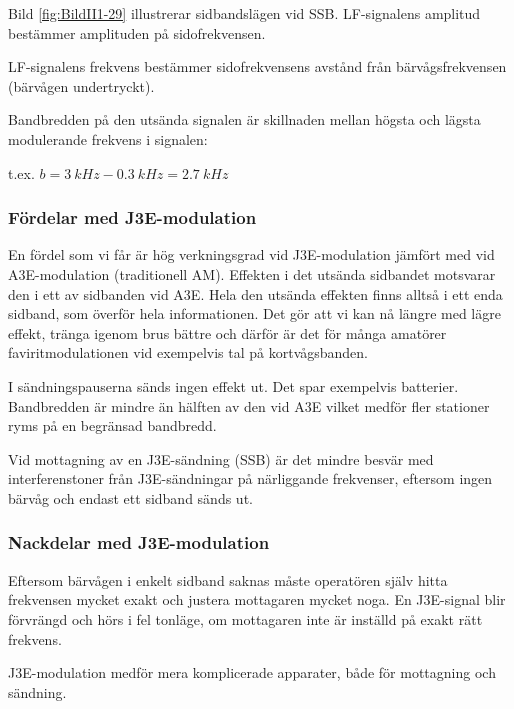 Bild \ref{fig:BildII1-29} illustrerar sidbandslägen vid SSB.
LF-signalens amplitud bestämmer amplituden på sidofrekvensen.

LF-signalens frekvens bestämmer sidofrekvensens avstånd från bärvågsfrekvensen
(bärvågen undertryckt).

Bandbredden på den utsända signalen är skillnaden mellan högsta och lägsta
modulerande frekvens i signalen:

t.ex. \(b = \SI{3}{kHz} - \SI{0,3}{kHz} = \SI{2,7}{kHz}\)

\subsubsection{Fördelar med J3E-modulation}

En fördel som vi får är hög verkningsgrad vid J3E-modulation jämfört med vid A3E-modulation (traditionell AM).
Effekten i det utsända sidbandet motsvarar den i ett av sidbanden vid A3E.
Hela den utsända effekten finns alltså i ett enda sidband,
som överför hela informationen. Det gör att vi kan nå längre med lägre effekt, tränga igenom brus bättre och därför är det för många amatörer faviritmodulationen vid exempelvis tal på kortvågsbanden.

I sändningspauserna sänds ingen effekt ut. Det spar exempelvis batterier.
Bandbredden är mindre än hälften av den vid A3E vilket medför fler stationer ryms på en begränsad bandbredd.

Vid mottagning av en J3E-sändning (SSB) är det mindre besvär med
interferenstoner från J3E-sändningar på närliggande frekvenser, eftersom ingen
bärvåg och endast ett sidband sänds ut.

\subsubsection{Nackdelar med J3E-modulation}

Eftersom bärvågen i enkelt sidband saknas måste operatören själv hitta frekvensen mycket exakt och justera mottagaren mycket noga. En J3E-signal blir förvrängd och hörs i fel tonläge, om mottagaren
inte är inställd på exakt rätt frekvens.

	
J3E-modulation medför mera komplicerade apparater, både för mottagning och
sändning.


